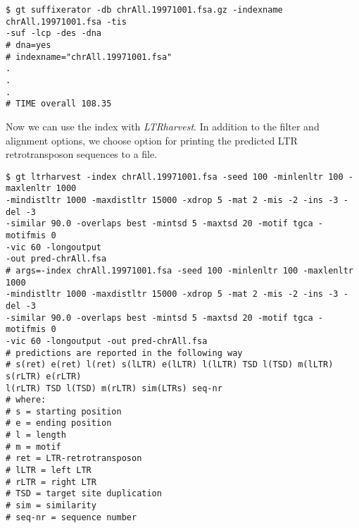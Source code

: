 \documentclass[12pt,titlepage]{article}
\newcommand{\LTRharvest}{\textit{LTRharvest}\xspace}
\begin{document}
\begin{footnotesize}
\begin{verbatim}
$ gt suffixerator -db chrAll.19971001.fsa.gz -indexname chrAll.19971001.fsa -tis 
-suf -lcp -des -dna
# dna=yes
# indexname="chrAll.19971001.fsa"
.
.
.
# TIME overall 108.35
\end{verbatim}
\end{footnotesize}

Now we can use the index with \LTRharvest. In addition to the filter and 
alignment options, we choose option  for printing the predicted 
LTR retrotransposon sequences to a file.

\begin{footnotesize}
\begin{verbatim}
$ gt ltrharvest -index chrAll.19971001.fsa -seed 100 -minlenltr 100 -maxlenltr 1000 
-mindistltr 1000 -maxdistltr 15000 -xdrop 5 -mat 2 -mis -2 -ins -3 -del -3 
-similar 90.0 -overlaps best -mintsd 5 -maxtsd 20 -motif tgca -motifmis 0 
-vic 60 -longoutput 
-out pred-chrAll.fsa
# args=-index chrAll.19971001.fsa -seed 100 -minlenltr 100 -maxlenltr 1000 
-mindistltr 1000 -maxdistltr 15000 -xdrop 5 -mat 2 -mis -2 -ins -3 -del -3 
-similar 90.0 -overlaps best -mintsd 5 -maxtsd 20 -motif tgca -motifmis 0 
-vic 60 -longoutput -out pred-chrAll.fsa                                                
# predictions are reported in the following way 
# s(ret) e(ret) l(ret) s(lLTR) e(lLTR) l(lLTR) TSD l(TSD) m(lLTR) s(rLTR) e(rLTR) 
l(rLTR) TSD l(TSD) m(rLTR) sim(LTRs) seq-nr                               
# where:                                                                                                                                                    # s = starting position                                                                                                                                     # e = ending position                                                                                                                                       # l = length                                                                                                                                                # m = motif                                                                                                                                                 # ret = LTR-retrotransposon                                                                                                                                 # lLTR = left LTR                                                                                                                                           # rLTR = right LTR                                                                                                                                          # TSD = target site duplication                                                                                                                             # sim = similarity                                                                                                                                          # seq-nr = sequence number

\end{verbatim}
\end{footnotesize}
\end{document}

